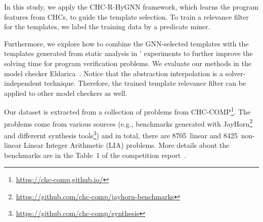 
In this study, we apply the CHC-R-HyGNN framework, which learns the program features from CHCs, to guide the template selection.  
%
To train a relevance filter for the templates, we label the training data by a predicate miner.

Furthermore, we explore how to combine the GNN-selected templates with the templates generated from static analysis in \cite{Leroux2016}' experiments to further improve the solving time for program verification problems.
%
We evaluate our methods in the model checker Eldarica~\cite{ruemmer2013disjunctive}.
%
Notice that the abstraction interpolation is a solver-independent technique. Therefore, the trained template relevance filter can be applied to other model checkers as well.


Our dataset is extracted from a collection of problems from CHC-COMP\footnote{\url{https://chc-comp.github.io/}}. The problems come from various sources (e.g., benchmarks generated with JayHorn\footnote{\url{https://github.com/chc-comp/jayhorn-benchmarks}} and differernt synthesis tools\footnote{\url{https://github.com/chc-comp/synthesis}}) and in total, there are 8705~linear and 8425~non-linear Linear Integer Arithmetic (LIA) problems.
%
More details about the benchmarks are in the Table~1 of the competition report~\cite{chcBenchmark}.




